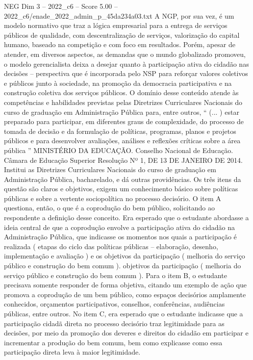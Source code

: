 \begin{textsample}{NEG Dim 3 – 2022\_c6 – Score 5.00 – 2022\_c6/enade\_2022\_admin\_p\_45da234a03.txt}
A NGP, por sua vez, é um modelo normativo que traz a lógica empresarial para a entrega de serviços públicos de qualidade, com descentralização de serviços, valorização do capital humano, baseado na competição e com foco em resultados.
Porém, apesar de atender, em diversos aspectos, as demandas que o mundo globalizado promoveu, o modelo gerencialista deixa a desejar quanto à participação ativa do cidadão nas decisões – perspectiva que é incorporada pelo NSP para reforçar valores coletivos e públicos junto à sociedade, na promoção da democracia participativa e na construção coletiva dos serviços públicos.
O domínio desse conteúdo atende às competências e habilidades previstas pelas Diretrizes Curriculares Nacionais do curso de graduação em Administração Pública para, entre outros, “ (... ) estar preparado para participar, em diferentes graus de complexidade, do processo de tomada de decisão e da formulação de políticas, programas, planos e projetos públicos e para desenvolver avaliações, análises e reflexões críticas sobre a área pública ” MINISTÉRIO DA EDUCAÇÃO.
Conselho Nacional de Educação.
Câmara de Educação Superior Resolução Nº 1, DE 13 DE JANEIRO DE 2014.
Institui as Diretrizes Curriculares Nacionais do curso de graduação em Administração Pública, bacharelado, e dá outras providências.
Os três itens da questão são claros e objetivos, exigem um conhecimento básico sobre políticas públicas e sobre a vertente sociopolítica no processo decisório.
O item A questiona, então, o que é a coprodução do bem público, solicitando ao respondente a definição desse conceito.
Era esperado que o estudante abordasse a ideia central de que a coprodução envolve a participação ativa do cidadão na Administração Pública, que indicasse os momentos nos quais a participação é realizada ( etapas do ciclo das políticas públicas – elaboração, desenho, implementação e avaliação ) e os objetivos da participação ( melhoria do serviço público e construção do bem comum ). objetivos da participação ( melhoria do serviço público e construção do bem comum ).
Para o item B, o estudante precisava somente responder de forma objetiva, citando um exemplo de ação que promova a coprodução de um bem público, como espaços decisórios amplamente conhecidos, orçamentos participativos, conselhos, conferências, audiências públicas, entre outros.
No item C, era esperado que o estudante indicasse que a participação cidadã direta no processo decisório traz legitimidade para as decisões, por meio da promoção dos deveres e direitos do cidadão em participar e incrementar a produção do bem comum, bem como explicasse como essa participação direta leva à maior legitimidade.

\end{textsample}

